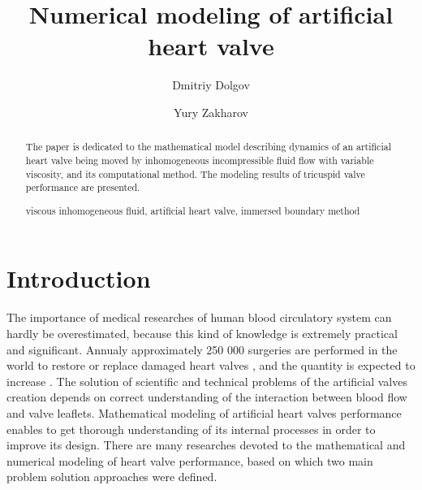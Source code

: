 \documentclass[runningheads,a4paper]{llncs}
\newcommand{\keywords}[1]{\par\addvspace\baselineskip
\noindent\keywordname\enspace\ignorespaces#1}
\begin{document}
\mainmatter  %

\title{Numerical modeling of artificial heart valve}


%
%
\author{Dmitriy Dolgov \and Yury Zakharov}
%


%
%

\maketitle


\begin{abstract}
    The paper is dedicated to the mathematical model describing dynamics of
    an artificial heart valve being moved by inhomogeneous incompressible fluid flow
    with variable viscosity, and its computational method. The modeling results of
    tricuspid valve performance are presented.
\keywords{viscous inhomogeneous fluid, artificial heart valve, immersed boundary method}
\end{abstract}


\section{Introduction}
The importance of medical researches of human blood circulatory system can hardly be overestimated,
because this kind of knowledge is extremely practical and significant. Annualy approximately 250 000
surgeries are performed in the world to restore or replace damaged heart valves \cite{yoganathan}, and the
quantity is expected to increase \cite{yacoub}. The solution of scientific and technical problems of the artificial valves 
creation depends on correct understanding of the interaction between blood flow and valve leaflets. Mathematical modeling
of artificial heart valves performance enables to get thorough understanding of its internal processes in order to improve its design.
There are many researches devoted to the mathematical and numerical modeling
of heart valve performance, based on which two main problem solution approaches were defined.
\end{document}
